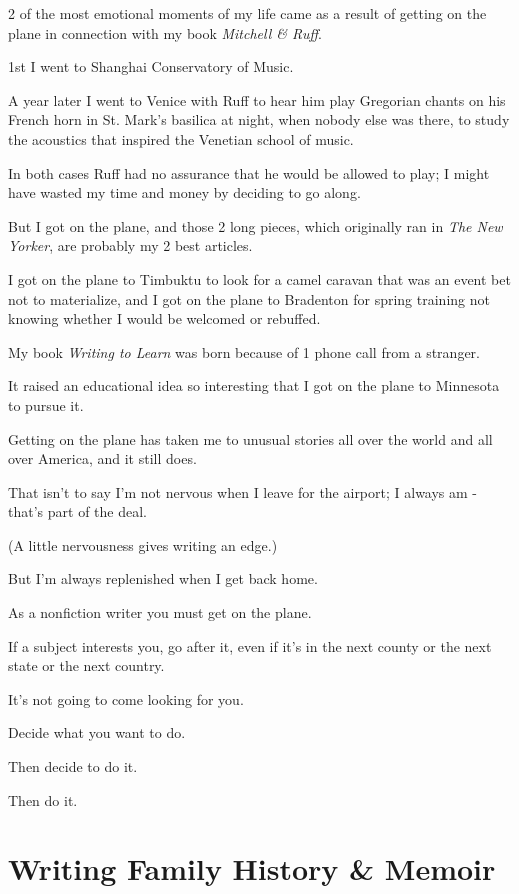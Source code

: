 \documentclass{book}
\numberwithin{equation}{section}
\begin{document}
2 of the most emotional moments of my life came as a result of getting on the plane in connection with my book \textit{Mitchell \& Ruff}.

1st I went to Shanghai Conservatory of Music.

A year later I went to Venice with Ruff to hear him play Gregorian chants on his French horn in St. Mark's basilica at night, when nobody else was there, to study the acoustics that inspired the Venetian school of music.

In both cases Ruff had no assurance that he would be allowed to play; I might have wasted my time and money by deciding to go along.

But I got on the plane, and those 2 long pieces, which originally ran in \textit{The New Yorker}, are probably my 2 best articles.

I got on the plane to Timbuktu to look for a camel caravan that was an event bet not to materialize, and I got on the plane to Bradenton for spring training not knowing whether I would be welcomed or rebuffed.

My book \textit{Writing to Learn} was born because of 1 phone call from a stranger.

It raised an educational idea so interesting that I got on the plane to Minnesota to pursue it.

%
Getting on the plane has taken me to unusual stories all over the world and all over America, and it still does.

That isn't to say I'm not nervous when I leave for the airport; I always am - that's part of the deal.

(A little nervousness gives writing an edge.)

But I'm always replenished when I get back home.

%
As a nonfiction writer you must get on the plane.

If a subject interests you, go after it, even if it's in the next county or the next state or the next country.

It's not going to come looking for you.

Decide what you want to do.

Then decide to do it.

Then do it.


\chapter{Writing Family History \& Memoir}
\end{document}
